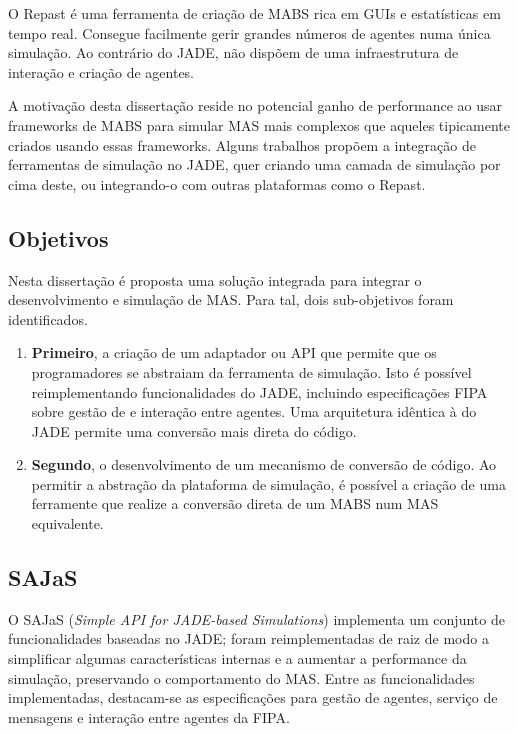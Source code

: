 \documentclass[9pt,a4paper]{extarticle}
\begin{document}
\begin{multicols}{2}
O Repast \cite{collier2003repast} é uma ferramenta de criação de MABS rica em GUIs e estatísticas em tempo real. Consegue facilmente gerir grandes números de agentes numa única simulação. Ao contrário do JADE, não dispõem de uma infraestrutura de interação e criação de agentes.

A motivação desta dissertação reside no potencial ganho de performance ao usar frameworks de MABS para simular MAS mais complexos que aqueles tipicamente criados usando essas frameworks. Alguns trabalhos \cite{garcia2011misia,gormer2011jrep} propõem a integração de ferramentas de simulação no JADE, quer criando uma camada de simulação por cima deste, ou integrando-o com outras plataformas como o Repast.

\subsection{Objetivos}
Nesta dissertação é proposta uma solução integrada para integrar o desenvolvimento e simulação de MAS. Para tal, dois sub-objetivos foram identificados.

\begin{enumerate}
  \item \textbf{Primeiro}, a criação de um adaptador ou API que permite que os programadores se abstraiam da ferramenta de simulação. Isto é possível reimplementando funcionalidades do JADE, incluindo especificações FIPA sobre gestão de e interação entre agentes. Uma arquitetura idêntica à do JADE permite uma conversão mais direta do código.

  \item \textbf{Segundo}, o desenvolvimento de um mecanismo de conversão de código. Ao permitir a abstração da plataforma de simulação, é possível a criação de uma ferramente que realize a conversão direta de um MABS num MAS equivalente.
\end{enumerate}

\subsection{SAJaS}

O SAJaS (\emph{Simple API for JADE-based Simulations}) implementa um conjunto de funcionalidades baseadas no JADE; foram reimplementadas de raiz de modo a simplificar algumas características internas e a aumentar a performance da simulação, preservando o comportamento do MAS. Entre as funcionalidades implementadas, destacam-se as especificações para gestão de agentes, serviço de mensagens e interação entre agentes da FIPA.


\end{multicols}
\end{document}
